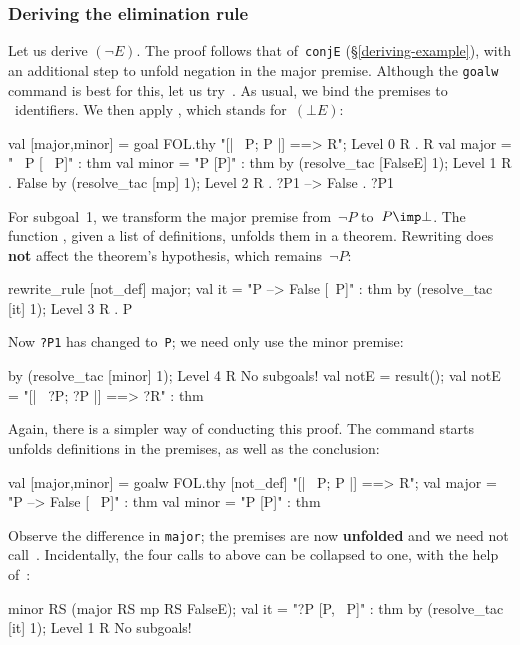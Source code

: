 \subsubsection{Deriving the elimination rule}
Let us derive $(\neg E)$.  The proof follows that of~{\tt conjE}
(\S\ref{deriving-example}), with an additional step to unfold negation in
the major premise.  Although the {\tt goalw} command is best for this, let
us try~.  As usual, we bind the premises to \ML\ identifiers.
We then apply , which stands for~$(\bot E)$:
\begin{ttbox}
val [major,minor] = goal FOL.thy "[| ~P;  P |] ==> R";
{\out Level 0}
{\out R}
{. R}
{\out val major = "~ P  [~ P]" : thm}
{\out val minor = "P  [P]" : thm}
\ttbreak
by (resolve_tac [FalseE] 1);
{\out Level 1}
{\out R}
{. False}
\ttbreak
by (resolve_tac [mp] 1);
{\out Level 2}
{\out R}
{. ?P1 --> False}
{. ?P1}
\end{ttbox}
For subgoal~1, we transform the major premise from~$\neg P$
to~${P\imp\bot}$.  The function , given a list of
definitions, unfolds them in a theorem.  Rewriting does {\bf not}
affect the theorem's hypothesis, which remains~$\neg P$:
\begin{ttbox}
rewrite_rule [not_def] major;
{\out val it = "P --> False  [~P]" : thm}
by (resolve_tac [it] 1);
{\out Level 3}
{\out R}
{. P}
\end{ttbox}
Now {\tt?P1} has changed to~{\tt P}; we need only use the minor premise:
\begin{ttbox}
by (resolve_tac [minor] 1);
{\out Level 4}
{\out R}
{\out No subgoals!}
val notE = result();
{\out val notE = "[| ~?P; ?P |] ==> ?R" : thm}
\end{ttbox}

\medskip
Again, there is a simpler way of conducting this proof.  The
 command starts unfolds definitions in the premises, as well
as the conclusion:
\begin{ttbox}
val [major,minor] = goalw FOL.thy [not_def]
    "[| ~P;  P |] ==> R";
{\out val major = "P --> False  [~ P]" : thm}
{\out val minor = "P  [P]" : thm}
\end{ttbox}
Observe the difference in {\tt major}; the premises are now {\bf unfolded}
and we need not call~.  Incidentally, the four calls
to  above can be collapsed to one, with the help
of~\@:
\begin{ttbox}
minor RS (major RS mp RS FalseE);
{\out val it = "?P  [P, ~P]" : thm}
by (resolve_tac [it] 1);
{\out Level 1}
{\out R}
{\out No subgoals!}
\end{ttbox}


